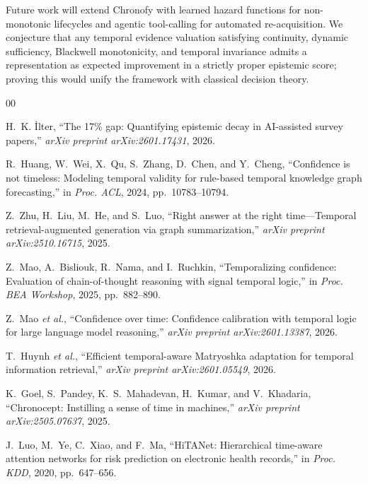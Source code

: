 \documentclass[conference]{IEEEtran}
\begin{document}
Future work will extend Chronofy with learned hazard functions for non-monotonic lifecycles and agentic tool-calling for automated re-acquisition. We conjecture that any temporal evidence valuation satisfying continuity, dynamic sufficiency, Blackwell monotonicity, and temporal invariance admits a representation as expected improvement in a strictly proper epistemic score; proving this would unify the framework with classical decision theory.



\begin{thebibliography}{00}
\setlength{\itemsep}{0pt}\setlength{\parskip}{0pt}

H.~K. {\.I}lter, ``The 17\% gap: Quantifying epistemic decay in AI-assisted survey papers,'' \emph{arXiv preprint arXiv:2601.17431}, 2026.

R.~Huang, W.~Wei, X.~Qu, S.~Zhang, D.~Chen, and Y.~Cheng, ``Confidence is not timeless: Modeling temporal validity for rule-based temporal knowledge graph forecasting,'' in \emph{Proc. ACL}, 2024, pp.~10783--10794.

Z.~Zhu, H.~Liu, M.~He, and S.~Luo, ``Right answer at the right time---Temporal retrieval-augmented generation via graph summarization,'' \emph{arXiv preprint arXiv:2510.16715}, 2025.

Z.~Mao, A.~Bisliouk, R.~Nama, and I.~Ruchkin, ``Temporalizing confidence: Evaluation of chain-of-thought reasoning with signal temporal logic,'' in \emph{Proc. BEA Workshop}, 2025, pp.~882--890.

Z.~Mao \emph{et al.}, ``Confidence over time: Confidence calibration with temporal logic for large language model reasoning,'' \emph{arXiv preprint arXiv:2601.13387}, 2026.

T.~Huynh \emph{et al.}, ``Efficient temporal-aware Matryoshka adaptation for temporal information retrieval,'' \emph{arXiv preprint arXiv:2601.05549}, 2026.

K.~Goel, S.~Pandey, K.~S.~Mahadevan, H.~Kumar, and V.~Khadaria, ``Chronocept: Instilling a sense of time in machines,'' \emph{arXiv preprint arXiv:2505.07637}, 2025.

J.~Luo, M.~Ye, C.~Xiao, and F.~Ma, ``HiTANet: Hierarchical time-aware attention networks for risk prediction on electronic health records,'' in \emph{Proc. KDD}, 2020, pp.~647--656.



\end{thebibliography}
\end{document}
